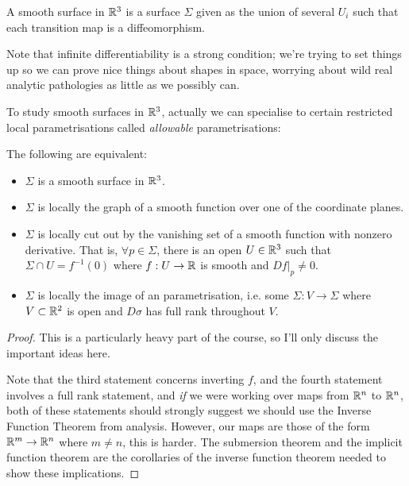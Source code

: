 \documentclass[11pt]{scrartcl}
\begin{document}
\begin{definition}

A smooth surface in $\mathbb R^3$ is a surface $\Sigma$ given as the union of several $U_i$ such that each transition map is a diffeomorphism.
\end{definition}

\begin{remark}
Note that infinite differentiability is a strong condition; we're trying to set things up so we can prove nice things about shapes in space, worrying about wild real analytic pathologies as little as we possibly can.
\end{remark}

To study smooth surfaces in $\mathbb R^3$, actually we can specialise to certain restricted local parametrisations called \textit{allowable} parametrisations:

\begin{theorem}
The following are equivalent:

\begin{itemize}
    \item $\Sigma$ is a smooth surface in $\mathbb R^3$. 
    \item $\Sigma$ is locally the graph of a smooth function over one of the coordinate planes.
    \item $\Sigma$ is locally cut out by the vanishing set of a smooth function with nonzero derivative. That is, $\forall p \in \Sigma$, there is an open $U \in \mathbb R^3$ such that $\Sigma \cap U = f^{-1}(0)$ where $f : U \rightarrow \mathbb R$ is smooth and $Df|_p \neq 0$.
    \item $\Sigma$ is locally the image of an  parametrisation, i.e. some $\Sigma : V \rightarrow \Sigma$ where $V \subset \mathbb R^2$ is open and $D \sigma$ has full rank throughout $V$.
\end{itemize}

\begin{proof}
    This is a particularly heavy part of the course, so I'll only discuss the important ideas here.

    Note that the third statement concerns inverting $f$, and the fourth statement involves a full rank statement, and \textit{if} we were working over maps from $\mathbb R^n$ to $\mathbb R^n$, both of these statements should strongly suggest we should use the Inverse Function Theorem from analysis. However, our maps are those of the form $\mathbb R^m \rightarrow \mathbb R^n$ where $m \neq n$, this is harder. The submersion theorem and the implicit function theorem are the corollaries of the inverse function theorem needed to show these implications.

\end{proof}
\end{theorem}
\end{document}

